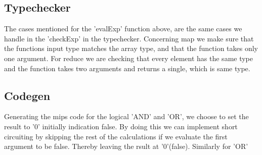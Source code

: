 \documentclass[12pt]{article}
\numberwithin{listing}{section}
\begin{document}
\subsection*{Typechecker}
The cases mentioned for the 'evalExp' function above, are the same cases we handle in the 'checkExp' in the typechecker. 
Concerning map we make sure that the functions input type matches the array type, and that the function takes only one argument. 
For reduce we are checking that every element has the same type and the function takes two arguments and returns a single, which is same type.


\subsection*{Codegen}
Generating the mips code for the logical ’AND’ and ’OR’, we choose to set the result to
’0’ initially indication false. By doing this we can implement short circuiting by skipping
the rest of the calculations if we evaluate the first argument to be false. Thereby leaving
the rsult at ’0’(false). Similarly for ’OR’\\
\end{document}
